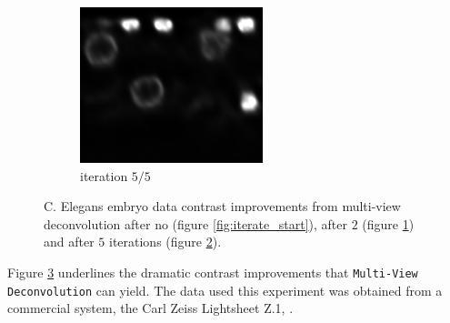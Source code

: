 \begin{figure}[h]
\begin{subfigure}[b]{0.3\textwidth}
    \label{fig:iterate_2}
  \end{subfigure}
  \hfill
  \hfill
  \begin{subfigure}[b]{0.3\textwidth}
    \includegraphics[width=\textwidth]{img/janosch_celegans_DAPI_nuclei_it5}
    \caption{iteration $5/5$}
    \label{fig:iterate_final}
  \end{subfigure}
  \hfill
  \caption{C. Elegans embryo data contrast improvements from multi-view deconvolution after no (figure \ref{fig:iterate_start}), after $2$ (figure \ref{fig:iterate_2}) and after $5$ iterations (figure \ref{fig:iterate_final}). }
  \label{fig:mvdeconv}
\end{figure}

Figure \ref{fig:mvdeconv} underlines the dramatic contrast improvements that \texttt{Multi-View Deconvolution} can yield. The data used this experiment was obtained from a commercial system, the Carl Zeiss Lightsheet Z.1, \cite{lz1}. 

